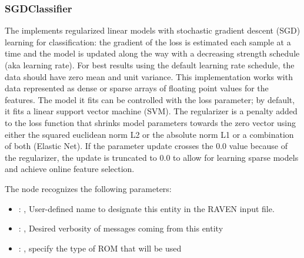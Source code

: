 \subsubsection{SGDClassifier}
  The  implements regularized linear models with stochastic
  gradient descent (SGD) learning for classification: the gradient of the loss is estimated each
  sample at                         a time and the model is updated along the way with a decreasing
  strength schedule                         (aka learning rate). For best results using the default
  learning rate schedule, the                         data should have zero mean and unit variance.
  This implementation works with data represented as dense or sparse arrays of floating
  point values for the features. The model it fits can be controlled with the loss parameter;
  by default, it fits a linear support vector machine (SVM).                         The regularizer
  is a penalty added to the loss function that shrinks model parameters towards
  the zero vector using either the squared euclidean norm L2 or the absolute norm L1 or a
  combination of both (Elastic Net). If the parameter update crosses the 0.0 value because
  of the regularizer, the update is truncated to $0.0$ to allow for learning sparse models and
  achieve online feature selection.                         

  The  node recognizes the following parameters:
    \begin{itemize}
      \item {}: , 
        User-defined name to designate this entity in the RAVEN input file.
      \item {}: , 
        Desired verbosity of messages coming from this entity
      \item {}: , 
        specify the type of ROM that will be used
  \end{itemize}

